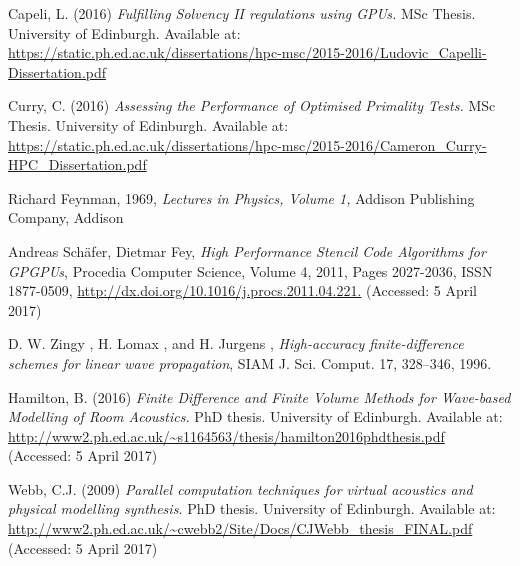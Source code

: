 \documentclass[a4paper,12pt]{article}
\begin{document}

\begin{thebibliography}{}

Capeli, L. (2016) \emph{Fulfilling Solvency II regulations using GPUs.} MSc Thesis. University of Edinburgh. Available at: \url{https://static.ph.ed.ac.uk/dissertations/hpc-msc/2015-2016/Ludovic_Capelli-Dissertation.pdf}

Curry, C. (2016) \emph{Assessing the Performance of Optimised Primality Tests.} MSc Thesis. University of Edinburgh. Available at: \url{https://static.ph.ed.ac.uk/dissertations/hpc-msc/2015-2016/Cameron_Curry-HPC_Dissertation.pdf}

Richard Feynman,  1969, 
\textit{Lectures in Physics, Volume 1,}
Addison Publishing Company, Addison


Andreas Schäfer, Dietmar Fey, \emph{High Performance Stencil Code Algorithms for GPGPUs}, Procedia Computer Science, Volume 4, 2011, Pages 2027-2036, ISSN 1877-0509, \url{http://dx.doi.org/10.1016/j.procs.2011.04.221.} (Accessed: 5 April 2017)


D. W. Zingy , H. Lomax , and H. Jurgens , \emph{High-accuracy finite-difference schemes for linear wave propagation}, SIAM J. Sci. Comput. 17, 328–346, 1996.

Hamilton, B. (2016) \emph{Finite Difference and Finite Volume Methods for
Wave-based Modelling of Room Acoustics.} PhD thesis. University of Edinburgh. Available at: \url{http://www2.ph.ed.ac.uk/~s1164563/thesis/hamilton2016phdthesis.pdf} (Accessed: 5 April 2017)

Webb, C.J. (2009) \emph{Parallel computation techniques for virtual
acoustics and physical modelling synthesis.} PhD thesis. University of Edinburgh. Available at: \url{http://www2.ph.ed.ac.uk/~cwebb2/Site/Docs/CJWebb_thesis_FINAL.pdf} (Accessed: 5 April 2017)

\end{thebibliography}
\end{document}
